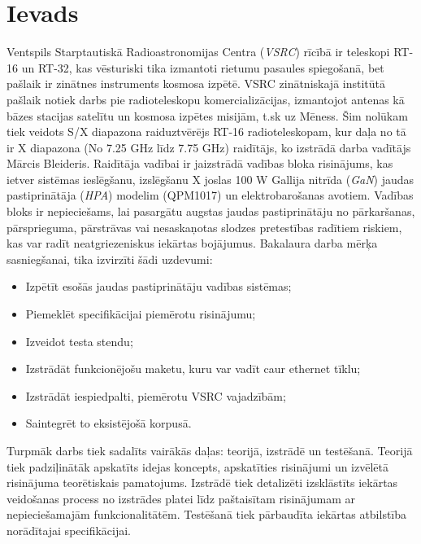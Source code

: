 \chapter{Ievads}
Ventspils Starptautiskā Radioastronomijas Centra (\textit{VSRC}) rīcībā ir teleskopi RT-16 un RT-32, kas vēsturiski tika izmantoti rietumu pasaules spiegošanā, bet pašlaik ir zinātnes instruments kosmosa izpētē. VSRC zinātniskajā institūtā pašlaik notiek darbs pie radioteleskopu komercializācijas, izmantojot antenas kā bāzes stacijas satelītu un kosmosa izpētes misijām, t.sk uz Mēness. Šim nolūkam tiek veidots S/X diapazona raiduztvērējs RT-16 radioteleskopam, kur daļa no tā ir X diapazona (No 7.25 GHz līdz 7.75 GHz) raidītājs, ko izstrādā darba vadītājs Mārcis Bleideris. Raidītāja vadībai ir jaizstrādā vadības bloka risinājums, kas ietver sistēmas ieslēgšanu, izslēgšanu X joslas 100 W Gallija nitrīda (\textit{GaN}) jaudas pastiprinātāja (\textit{HPA}) modelim (QPM1017) un elektrobarošanas avotiem. Vadības bloks ir nepieciešams, lai pasargātu augstas jaudas pastiprinātāju no pārkaršanas, pārsprieguma, pārstrāvas vai nesaskaņotas slodzes pretestības radītiem riskiem, kas var radīt neatgriezeniskus iekārtas bojājumus. 
Bakalaura darba mērķa sasniegšanai, tika izvirzīti šādi uzdevumi:
\begin{itemize}
    \item Izpētīt esošās jaudas pastiprinātāju vadības sistēmas;
    \item Piemeklēt specifikācijai piemērotu risinājumu;
    \item Izveidot testa stendu;
    \item Izstrādāt funkcionējošu maketu, kuru var vadīt caur ethernet tīklu;
    \item Izstrādāt iespiedpalti, piemērotu VSRC vajadzībām;
    \item Saintegrēt to eksistējošā korpusā.
\end{itemize}
Turpmāk darbs tiek sadalīts vairākās daļas: teorijā, izstrādē un testēšanā. Teorijā tiek padziļinātāk apskatīts idejas koncepts, apskatīties risinājumi un izvēlētā risinājuma teorētiskais pamatojums. Izstrādē tiek detalizēti izsklāstīts iekārtas veidošanas process no izstrādes platei līdz paštaisītam risinājumam ar nepieciešamajām funkcionalitātēm. Testēšanā tiek pārbaudīta iekārtas atbilstība norādītajai specifikācijai.

